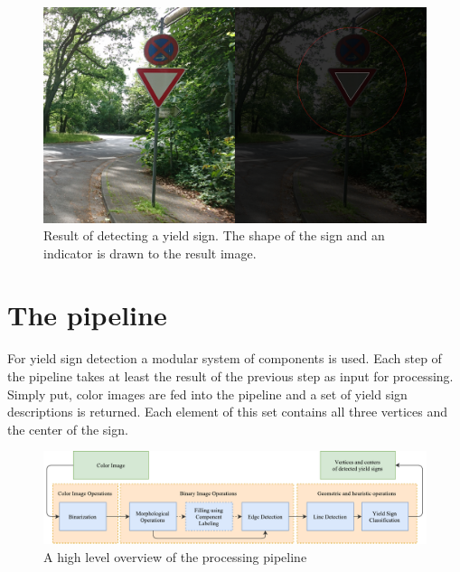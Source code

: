 \documentclass{report}
\begin{document}
\begin{figure}
  \centering
    \includegraphics[width=1\textwidth]{src/result}
  \caption{Result of detecting a yield sign. The shape of the sign
    and an indicator is drawn to the result image.}
  \label{img:result}
\end{figure}


\pagebreak
\chapter{The pipeline}
\label{chap:pipeline}

For yield sign detection a modular system of components is used. Each
step of the pipeline takes at least the result of the previous step as
input for processing. Simply put, color images are fed into the
pipeline and a set of yield sign descriptions is returned. Each
element of this set contains all three vertices and the center of the
sign.

\begin{figure}
  \centering
    \includegraphics[width=1\textwidth]{src/pipeline}
  \caption{A high level overview of the processing pipeline}
  \label{img:pipeline}
\end{figure}
\end{document}
